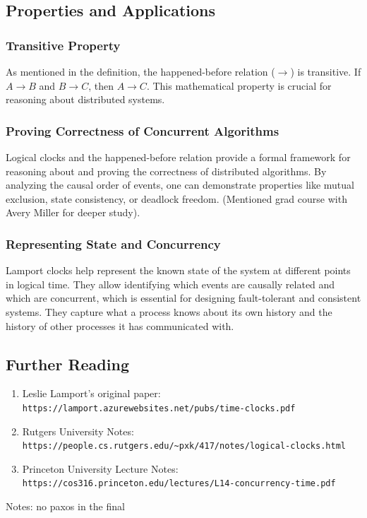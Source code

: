 \subsection{Properties and Applications}

\subsubsection{Transitive Property}
As mentioned in the definition, the happened-before relation (\( \rightarrow \)) is transitive. If \( A \rightarrow B \) and \( B \rightarrow C \), then \( A \rightarrow C \). This mathematical property is crucial for reasoning about distributed systems.

\subsubsection{Proving Correctness of Concurrent Algorithms}
Logical clocks and the happened-before relation provide a formal framework for reasoning about and proving the correctness of distributed algorithms. By analyzing the causal order of events, one can demonstrate properties like mutual exclusion, state consistency, or deadlock freedom. (Mentioned grad course with Avery Miller for deeper study).

\subsubsection{Representing State and Concurrency}
Lamport clocks help represent the known state of the system at different points in logical time. They allow identifying which events are causally related and which are concurrent, which is essential for designing fault-tolerant and consistent systems. They capture what a process knows about its own history and the history of other processes it has communicated with.

\subsection{Further Reading}
\begin{enumerate}[label=\roman*), noitemsep]
    \item Leslie Lamport's original paper: \texttt{https://lamport.azurewebsites.net/pubs/time-clocks.pdf}
    \item Rutgers University Notes: \texttt{https://people.cs.rutgers.edu/\~{}pxk/417/notes/logical-clocks.html}
    \item Princeton University Lecture Notes: \texttt{https://cos316.princeton.edu/lectures/L14-concurrency-time.pdf}
\end{enumerate}

Notes: 
no paxos in the final

